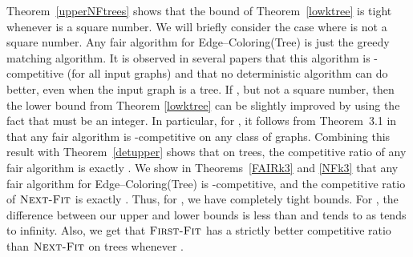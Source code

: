 \documentclass[smallextended]{svjour3}
\newcommand{\NF}{\ensuremath{\operatorname{\textsc{Next-Fit}}}\xspace}
\newcommand{\FF}{\ensuremath{\operatorname{\textsc{First-Fit}}}\xspace}
\begin{document}
Theorem~\ref{upperNFtrees} shows that the bound of Theorem~\ref{lowktree} is tight whenever  is a square number. We will briefly consider the case where  is not a square
number. Any fair algorithm for {\sc Edge--Coloring(Tree)} is just
the greedy matching algorithm. It is observed in several papers that this algorithm is -competitive (for all input graphs) and that no deterministic algorithm can do better, even when the input graph is a tree.  If , but not a square number, then the lower bound from Theorem \ref{lowktree} can be slightly improved by using the fact that  must be an integer. In particular, for , it follows from Theorem~3.1 in~\cite{kedge} that any fair algorithm is -competitive on any class of graphs. Combining this result with Theorem~\ref{detupper} shows that on trees, the competitive ratio of any fair algorithm is exactly .
We show in Theorems~\ref{FAIRk3} and \ref{NFk3} that any fair algorithm for {\sc Edge--Coloring(Tree)} is -competitive, and the competitive ratio of \NF is exactly .
Thus, for , we have completely tight bounds.
For , the difference between our upper and lower bounds is less than  and tends to  as  tends to infinity. Also, we get that \FF has a strictly better competitive ratio than \NF on trees whenever .
\end{document}
